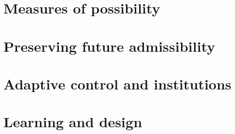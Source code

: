 \documentclass[11pt,twoside]{book}
\begin{document}








\part{Measures of possibility}







\part{Preserving future admissibility}







\part{Adaptive control and institutions}






\part{Learning and design}







\appendix








\end{document}

